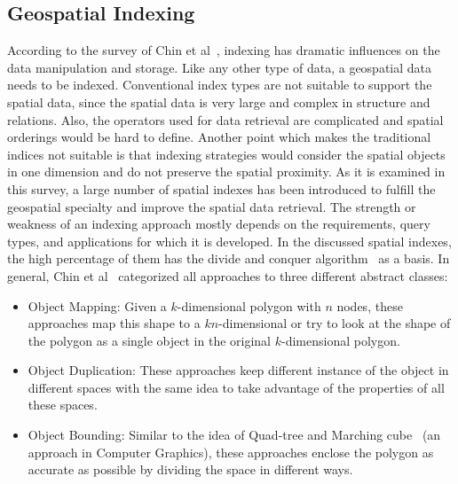 \documentclass[a4paper,12pt]{article}
\begin{document}
\subsection{Geospatial Indexing}
\label{s.geospatial-index}
According to the survey of Chin et al~\cite{survey}, indexing has dramatic influences on the data manipulation and storage. Like any other type of data, a geospatial data needs to be indexed. Conventional index types are not suitable to support the spatial data, since the spatial data is very large and complex in structure and relations. Also, the operators used for data retrieval are complicated and spatial orderings would be hard to define. Another point which makes the traditional indices not suitable is that indexing strategies would consider the spatial objects in one dimension and do not preserve the spatial proximity.
As it is examined in this survey, a large number of spatial indexes has been introduced to fulfill the geospatial specialty and improve the spatial data retrieval. The strength or weakness of an indexing approach mostly depends on the requirements, query types, and applications for which it is developed. 
In the discussed spatial indexes, the high percentage of them has the divide and conquer algorithm~\cite{divconquer} as a basis. 
In general, Chin et al~\cite{survey} categorized all approaches to three different abstract classes:
\begin{itemize}
\item Object Mapping: Given a $k$-dimensional polygon with $n$ nodes, these approaches map this shape to a $kn$-dimensional or try to look at the shape of the polygon as a single object in the original $k$-dimensional polygon.   
\item Object Duplication: These approaches keep different instance of the object in different spaces with the same idea to take advantage of the properties of all these spaces. 
\item Object Bounding: Similar to the idea of Quad-tree and Marching cube~\cite{marchingcube} (an approach in Computer Graphics), 
these approaches enclose the polygon as accurate as possible by dividing the space in different ways. 
\end{itemize}
\end{document}
